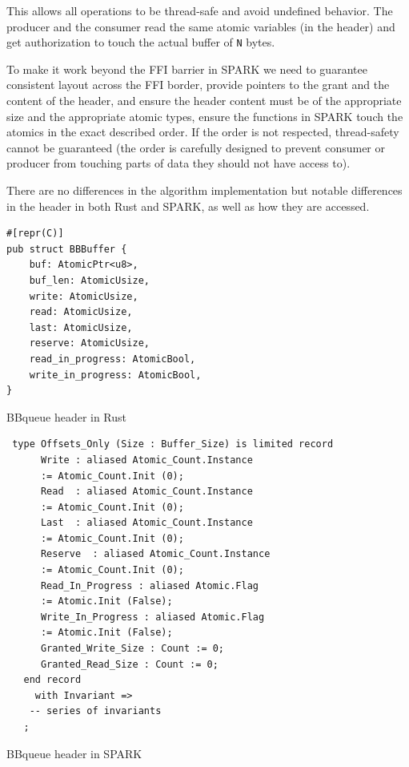 \documentclass[nomenclature, english, bibtex]{kththesis}
\begin{document}
This allows all operations to be thread-safe and avoid undefined behavior. The producer and the consumer read the same atomic variables (in the header) and get authorization to touch the actual buffer of \texttt{N} bytes.


To make it work beyond the FFI barrier in SPARK we need to guarantee consistent layout across the FFI border, provide pointers to the grant and the content of the header, and ensure the header content must be of the appropriate size and the appropriate atomic types, ensure the functions in SPARK touch the atomics in the exact described order. If the order is not respected, thread-safety cannot be guaranteed (the order is carefully designed to prevent consumer or producer from touching parts of data they should not have access to).

There are no differences in the algorithm implementation but notable differences in the header in both Rust and SPARK, as well as how they are accessed.

\begin{listing}[!ht]
\begin{verbatim}
#[repr(C)]
pub struct BBBuffer {
    buf: AtomicPtr<u8>,
    buf_len: AtomicUsize,
    write: AtomicUsize,
    read: AtomicUsize,
    last: AtomicUsize,
    reserve: AtomicUsize,
    read_in_progress: AtomicBool,
    write_in_progress: AtomicBool,
}
\end{verbatim}
\caption[BBqueue header in Rust]{BBqueue header in Rust}
\label{lst:rust_bbqueue_header}
\end{listing}
\FloatBarrier

\begin{listing}[!ht]
\begin{verbatim}
 type Offsets_Only (Size : Buffer_Size) is limited record
      Write : aliased Atomic_Count.Instance 
      := Atomic_Count.Init (0);
      Read  : aliased Atomic_Count.Instance 
      := Atomic_Count.Init (0);
      Last  : aliased Atomic_Count.Instance 
      := Atomic_Count.Init (0);
      Reserve  : aliased Atomic_Count.Instance 
      := Atomic_Count.Init (0);
      Read_In_Progress : aliased Atomic.Flag 
      := Atomic.Init (False);
      Write_In_Progress : aliased Atomic.Flag 
      := Atomic.Init (False);
      Granted_Write_Size : Count := 0;
      Granted_Read_Size : Count := 0;
   end record
     with Invariant =>
    -- series of invariants
   ;
\end{verbatim}
\caption[BBqueue header in SPARK]{BBqueue header in SPARK}
\label{lst:SPARK_bbqueue_header}
\end{listing}
\FloatBarrier
\end{document}
